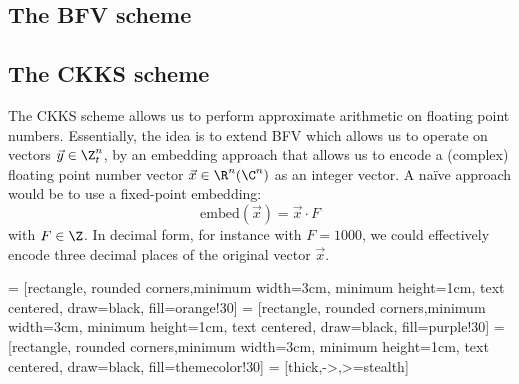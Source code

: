 \subsection{The BFV scheme}
\cite{2012-fv-original}
\cite{2012-brakerski}

\subsection{The CKKS scheme}
The CKKS scheme allows us to perform approximate arithmetic on floating point numbers.
Essentially, the idea is to extend BFV which allows us to operate on vectors $\vec{y} \in \Z_t^n$,
by an embedding approach that allows us to encode a (complex) floating point number vector $\vec{x} \in \R^n (\C^n)$
as an integer vector. A na\"ive approach would be to use a fixed-point embedding:
\newcommand{\embed}{\mathrm{embed}}
$$\embed(\vec{x}) = \vec{x} \cdot F$$
with $F \in \Z$. In decimal form, for instance with $F = 1000$, we could effectively encode
three decimal places of the original vector $\vec{x}$.

 = [rectangle, rounded corners,minimum width=3cm, minimum height=1cm, text centered, draw=black, fill=orange!30]
 = [rectangle, rounded corners,minimum width=3cm, minimum height=1cm, text centered, draw=black, fill=purple!30]
 = [rectangle, rounded corners,minimum width=3cm, minimum height=1cm, text centered, draw=black, fill=themecolor!30]
 = [thick,->,>=stealth]

